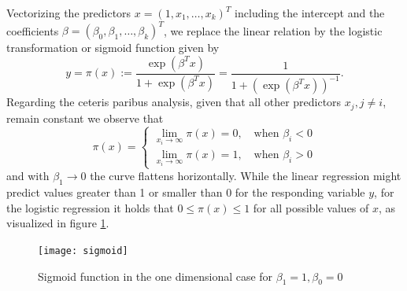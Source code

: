\documentclass[a4paper, 12pt]{scrreprt}
\begin{document}
Vectorizing the predictors $x = (1, x_1, \ldots, x_k)^T$ including the intercept and the coefficients $\beta = (\beta_0, \beta_1, \ldots, \beta_k)^T$, we replace the linear relation by the logistic transformation or sigmoid function given by
\begin{equation}
y = \pi(x) := \frac{\exp(\beta^T x)}{1+\exp(\beta^T x)} = \frac{1}{1+(\exp(\beta^T x))^{-1}}.
\end{equation}
Regarding the ceteris paribus analysis, given that all other predictors $x_j, j \neq i$, remain constant we observe that 
\begin{equation} 
\pi(x) =  \begin{cases}
\lim\limits_{x_i \to \infty} \pi(x) = 0, \quad \text{when } \beta_i < 0  \\
\lim\limits_{x_i \to \infty} \pi(x) = 1, \quad \text{when } \beta_i > 0 
\end{cases}
\end{equation}
and with $\beta_1 \to 0$ the curve flattens horizontally. 
While the linear regression might predict values greater than 1 or smaller than 0 for the responding variable $y$, for the logistic regression it holds that $0 \leq \pi(x) \leq 1$ for all possible values of $x$, as visualized in figure \ref{sigmoid}.

\begin{figure}[H]
	\texttt{[image: sigmoid]}
	\centering
	\caption{Sigmoid function in the one dimensional case for $\beta_1=1, \beta_0 =0$}
	\label{sigmoid}
\end{figure}

\bigskip
\end{document}
